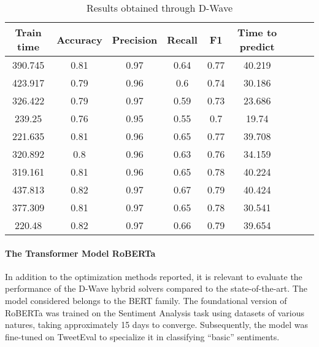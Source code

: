 \begin{table}[h]
    \centering
    \begin{tabular}{ccccccccc}
    \toprule
    Train time & Accuracy & Precision & Recall & F1    & Time to predict \\
    \midrule
    390.745    & 0.81     & 0.97      & 0.64   & 0.77  & 40.219          \\
    423.917    & 0.79     & 0.96      & 0.6    & 0.74  & 30.186          \\
    326.422    & 0.79     & 0.97      & 0.59   & 0.73  & 23.686          \\
    239.25     & 0.76     & 0.95      & 0.55   & 0.7   & 19.74           \\
    221.635    & 0.81     & 0.96      & 0.65   & 0.77  & 39.708          \\
    320.892    & 0.8      & 0.96      & 0.63   & 0.76  & 34.159          \\
    319.161    & 0.81     & 0.96      & 0.65   & 0.78  & 40.224          \\
    437.813    & 0.82     & 0.97      & 0.67   & 0.79  & 40.424          \\
    377.309    & 0.81     & 0.97      & 0.65   & 0.78  & 30.541          \\
    220.48     & 0.82     & 0.97      & 0.66   & 0.79  & 39.654          \\
    \bottomrule
    \end{tabular}
    \caption{Results obtained through D-Wave}
    \label{tab:QSVM2}
\end{table}

\paragraph{The Transformer Model RoBERTa} In addition to the optimization methods reported, it is relevant to evaluate the performance of the D-Wave hybrid solvers compared to the state-of-the-art. The model considered belongs to the BERT family. The foundational version of RoBERTa\cite{roberta-base} was trained on the Sentiment Analysis task using datasets of various natures, taking approximately 15 days to converge. Subsequently, the model was fine-tuned on TweetEval\cite{tweetRoberta}\cite{robertamodel} to specialize it in classifying ``basic'' sentiments.

